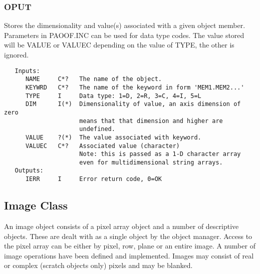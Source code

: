 \subsubsection{OPUT}
   Stores the dimensionality and value(s) associated with a given
object member.   Parameters in PAOOF.INC can be used for data type
codes.  The value stored will be VALUE or VALUEC depending on the
value of TYPE, the other is ignored.
{\small\begin{verbatim}
   Inputs:
      NAME     C*?   The name of the object.
      KEYWRD   C*?   The name of the keyword in form 'MEM1.MEM2...'
      TYPE     I     Data type: 1=D, 2=R, 3=C, 4=I, 5=L
      DIM      I(*)  Dimensionality of value, an axis dimension of zero
                     means that that dimension and higher are
                     undefined.
      VALUE    ?(*)  The value associated with keyword.
      VALUEC   C*?   Associated value (character)
                     Note: this is passed as a 1-D character array
                     even for multidimensional string arrays.
   Outputs:
      IERR     I     Error return code, 0=OK
\end{verbatim}}

\subsection{Image Class}
   An image object consists of a pixel array object and a number
of descriptive objects.  These are dealt with as a single object
by the object manager.  Access to the pixel array can be either
by pixel, row, plane or an entire image.  A number of image operations
have been defined and implemented.  Images may consist of real or
complex (scratch objects only) pixels and may be blanked.

